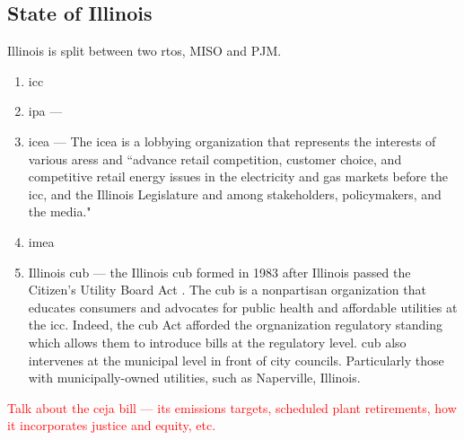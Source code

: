 \subsection{State of Illinois}
Illinois is split between two \acp{rto}, MISO and PJM.

\begin{enumerate}
    \item \acf{icc}
    \item \acf{ipa} --- 
    \item \acf{icea} --- The \ac{icea} is a lobbying organization that
    represents the interests of various \acp{ares} and ``advance retail
    competition, customer choice, and competitive retail energy issues in the
    electricity and gas markets before the \ac{icc}, and the Illinois
    Legislature and among stakeholders, policymakers, and the media."
    \item \acf{imea}
    \item Illinois \acf{cub} --- the Illinois \ac{cub} formed in 1983 after
    Illinois passed the Citizen's Utility Board Act
    \cite{illinois_83rd_general_assembly_citizens_1983}. The \ac{cub} is a
    nonpartisan organization that educates consumers and advocates for public
    health and affordable utilities at the \ac{icc}. Indeed, the \ac{cub} Act
    afforded the orgnanization regulatory standing which allows them to
    introduce bills at the regulatory level. \ac{cub} also intervenes at the
    municipal level in front of city councils. Particularly those with
    municipally-owned utilities, such as Naperville, Illinois.
\end{enumerate}

\textcolor{red}{Talk about the \ac{ceja} bill --- its emissions targets,
scheduled plant retirements, how it incorporates justice and equity, etc.}

